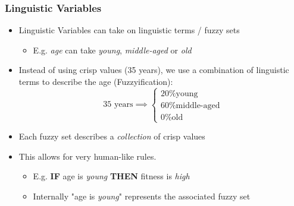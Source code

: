 \documentclass[
	10pt,
	t		%
]{beamer}
\begin{document}
\begin{frame}
	\frametitle{Linguistic Variables}
	\begin{itemize}
		\item Linguistic Variables can take on linguistic terms / fuzzy sets
		      \begin{itemize}
			      \item E.g. \textit{age} can take \textit{young}, \textit{middle-aged} or \textit{old}
		      \end{itemize}
		\item Instead of using crisp values (35 years), we use a combination of linguistic terms to describe the age (Fuzzyification):
		      \[ \text{ 35 years} \implies  \begin{cases}
				      \text{20\% young}       \\
				      \text{60\% middle-aged} \\
				      \text{0\% old}
			      \end{cases}
		      \]
		\item Each fuzzy set describes a \textit{collection} of crisp values
		\item This allows for very human-like rules.
		      \begin{itemize}
			      \item E.g. \textbf{IF} age is \textit{young} \textbf{THEN} fitness is \textit{high}
			      \item Internally "age is \textit{young}" represents the associated fuzzy set
		      \end{itemize}
	\end{itemize}
\end{frame}
\end{document}

